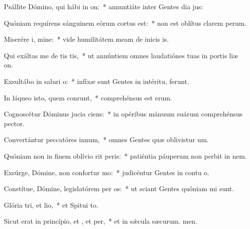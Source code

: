 \item Psállite Dómino, qui hábi in on:~* annuntiáte inter Gentes dia jus:
\item Quóniam requírens sánguinem eórum cortus est:~* non est oblítus clarem perum.
\item Miserére i, mine:~* vide humilitátem meam de inicis is.
\item Qui exáltas me de tis tis,~* ut annúntiem omnes laudatiónes tuas in portis liæ on.
\item Exsultábo in saluri o:~* infíxæ sunt Gentes in intéritu,  ferunt.
\item In láqueo isto, quem conrunt,~* comprehénsus est  erum.
\item Cognoscétur Dóminus jucia ciens:~* in opéribus mánuum suárum comprehénsus  pector.
\item Convertántur peccatóres  innum,~* omnes Gentes quæ oblivistur um.
\item Quóniam non in finem oblívio rit peris:~* patiéntia páuperum non perbit in nem.
\item Exsúrge, Dómine, non confortur mo:~* judicéntur Gentes in contu o.
\item Constítue, Dómine, legislatórem per os:~* ut sciant Gentes quóniam mi sunt.
\item Glória tri, et lio,~* et Spitui to.
\item Sicut erat in princípio, et , et per,~* et in sǽcula sæcurum. men.
